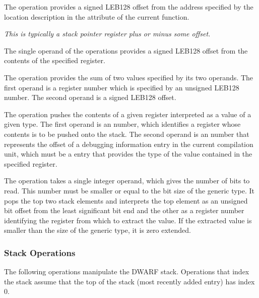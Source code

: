 \begin{enumerate}[1. ]
\itembfnl{\DWOPfbregTARG}
The \DWOPfbregNAME{} operation provides a
signed LEB128 offset
from the address specified by the location description in the
\DWATframebase{} attribute of the current function.

\textit{This is typically a stack pointer register plus or minus some offset.}

\itembfnl{\DWOPbregzeroTARG, \DWOPbregoneTARG, \dots, \DWOPbregthirtyoneTARG}
The single operand of the \DWOPbregnTARG{}
operations provides
a signed LEB128 offset from
the contents of the specified register.

\itembfnl{\DWOPbregxTARG}
The \DWOPbregxNAME{} operation provides the sum of two values specified
by its two operands. The first operand is a register number
which is specified by an unsigned LEB128
number. The second operand is a signed LEB128 offset.

\itembfnl{\DWOPregvaltypeTARG}
The \DWOPregvaltypeNAME{} operation
\bb
pushes
\eb
the contents of
a given register interpreted as a value of a given type. The first
operand is an \ULEB{} number,
which identifies a register whose contents is to
be pushed onto the stack. The second operand is an \ULEB{} number
that represents the offset of a debugging information entry in the current
compilation unit, which must be a \DWTAGbasetype{} entry that provides the
type of the value contained in the specified register.

\bb
\itembfnl{\DWOPregvalbitsTARG}
The \DWOPregvalbitsNAME{} operation takes a single \ULEB{}
integer operand, which gives the number of bits to read. This number must
be smaller or equal to the bit size of the generic type.  It pops
the top two stack elements and interprets the top element as an
unsigned bit offset from the least significant bit end and the
other as a register number identifying the register from which to
extract the value.  If the extracted value is smaller than the size
of the generic type, it is zero extended.
\eb

\end{enumerate}

\subsubsection{Stack Operations}
\label{chap:stackoperations}
The following
operations manipulate the DWARF stack. Operations
that index the stack assume that the top of the stack (most
recently added entry) has index 0.


